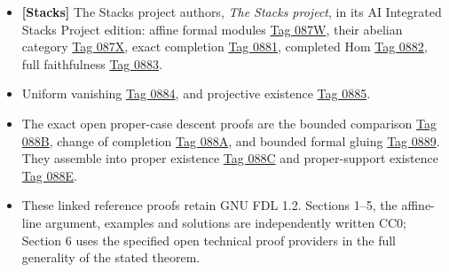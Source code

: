 \documentclass[11pt]{article}
\providecommand{\tightlist}{\setlength{\itemsep}{0pt}\setlength{\parskip}{0pt}}
\begin{document}
\begin{itemize}
\tightlist
\item
  \textbf{{[}Stacks{]}} The Stacks project authors, \emph{The Stacks
  project}, in its AI Integrated Stacks Project edition: affine formal
  modules
  \href{https://kokunoyumeto.github.io/stacks-zh-hans-cn/en/coherent.html\#coherent-lemma-inverse-systems-affine}{Tag
  087W}, their abelian category
  \href{https://kokunoyumeto.github.io/stacks-zh-hans-cn/en/coherent.html\#coherent-lemma-inverse-systems-abelian}{Tag
  087X}, exact completion
  \href{https://kokunoyumeto.github.io/stacks-zh-hans-cn/en/coherent.html\#coherent-lemma-exact}{Tag
  0881}, completed Hom
  \href{https://kokunoyumeto.github.io/stacks-zh-hans-cn/en/coherent.html\#coherent-lemma-completion-internal-hom}{Tag
  0882}, full faithfulness
  \href{https://kokunoyumeto.github.io/stacks-zh-hans-cn/en/coherent.html\#coherent-lemma-fully-faithful}{Tag
  0883}.
\item
  Uniform vanishing
  \href{https://kokunoyumeto.github.io/stacks-zh-hans-cn/en/coherent.html\#coherent-lemma-vanishing-projective}{Tag
  0884}, and projective existence
  \href{https://kokunoyumeto.github.io/stacks-zh-hans-cn/en/coherent.html\#coherent-lemma-existence-projective}{Tag
  0885}.
\item
  The exact open proper-case descent proofs are the bounded comparison
  \href{https://kokunoyumeto.github.io/stacks-zh-hans-cn/en/coherent.html\#coherent-lemma-inverse-systems-push-pull}{Tag
  088B}, change of completion
  \href{https://kokunoyumeto.github.io/stacks-zh-hans-cn/en/coherent.html\#coherent-lemma-existence-tricky}{Tag
  088A}, and bounded formal gluing
  \href{https://kokunoyumeto.github.io/stacks-zh-hans-cn/en/coherent.html\#coherent-lemma-existence-easy}{Tag
  0889}. They assemble into proper existence
  \href{https://kokunoyumeto.github.io/stacks-zh-hans-cn/en/coherent.html\#coherent-proposition-existence-proper}{Tag
  088C} and proper-support existence
  \href{https://kokunoyumeto.github.io/stacks-zh-hans-cn/en/coherent.html\#coherent-theorem-grothendieck-existence}{Tag
  088E}.
\item
  These linked reference proofs retain GNU FDL 1.2. Sections 1--5, the
  affine-line argument, examples and solutions are independently written
  CC0; Section 6 uses the specified open technical proof providers in
  the full generality of the stated theorem.
\end{itemize}
\end{document}

